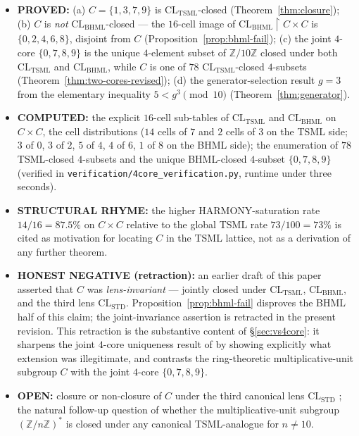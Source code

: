 \documentclass[11pt,reqno]{amsart}
\theoremstyle{plain}
\theoremstyle{definition}
\theoremstyle{remark}
\newcommand{\Z}{\mathbb{Z}}
\newcommand{\TSML}{\mathrm{TSML}}
\newcommand{\BHML}{\mathrm{BHML}}
\begin{document}
\begin{itemize}
\item \textbf{PROVED:} (a) $C = \{1, 3, 7, 9\}$ is $\mathrm{CL}_\TSML$-closed
(Theorem~\ref{thm:closure}); (b) $C$ is \emph{not}
$\mathrm{CL}_\BHML$-closed --- the $16$-cell image of
$\mathrm{CL}_\BHML \restriction C \times C$ is $\{0, 2, 4, 6, 8\}$,
disjoint from $C$ (Proposition~\ref{prop:bhml-fail}); (c) the joint
$4$-core $\{0, 7, 8, 9\}$ is the unique $4$-element subset of $\Z/10\Z$
closed under both $\mathrm{CL}_\TSML$ and $\mathrm{CL}_\BHML$, while
$C$ is one of $78$ $\mathrm{CL}_\TSML$-closed $4$-subsets
(Theorem~\ref{thm:two-cores-revised}); (d) the generator-selection
result $g = 3$ from the elementary inequality $5 < g^3 \pmod{10}$
(Theorem~\ref{thm:generator}).
\item \textbf{COMPUTED:} the explicit $16$-cell sub-tables of
$\mathrm{CL}_\TSML$ and $\mathrm{CL}_\BHML$ on $C \times C$, the cell
distributions ($14$ cells of $7$ and $2$ cells of $3$ on the TSML side;
$3$ of $0$, $3$ of $2$, $5$ of $4$, $4$ of $6$, $1$ of $8$ on the BHML
side); the enumeration of $78$ TSML-closed $4$-subsets and the unique
BHML-closed $4$-subset $\{0, 7, 8, 9\}$ (verified in
\texttt{verification/4core\_verification.py}, runtime under three
seconds).
\item \textbf{STRUCTURAL RHYME:} the higher HARMONY-saturation rate
$14/16 = 87.5\%$ on $C \times C$ relative to the global TSML rate
$73/100 = 73\%$ \cite[D10]{SandersForcing} is cited as motivation for
locating $C$ in the TSML lattice, not as a derivation of any further
theorem.
\item \textbf{HONEST NEGATIVE (retraction):} an earlier draft of this
paper asserted that $C$ was \emph{lens-invariant} --- jointly closed
under $\mathrm{CL}_\TSML$, $\mathrm{CL}_\BHML$, and the third lens
$\mathrm{CL}_\mathrm{STD}$.  Proposition~\ref{prop:bhml-fail}
disproves the BHML half of this claim; the joint-invariance assertion
is retracted in the present revision.  This retraction is the
substantive content of \S\ref{sec:vs4core}: it sharpens the joint
$4$-core uniqueness result of \cite{SandersGishFourCore} by showing
explicitly what extension was illegitimate, and contrasts the
ring-theoretic multiplicative-unit subgroup $C$ with the joint
$4$-core $\{0, 7, 8, 9\}$.
\item \textbf{OPEN:} closure or non-closure of $C$ under the third
canonical lens $\mathrm{CL}_\mathrm{STD}$ \cite{SandersGishThreeSubstrate};
the natural follow-up question of whether the multiplicative-unit
subgroup $(\Z/n\Z)^*$ is closed under any canonical TSML-analogue for
$n \neq 10$.
\end{itemize}
\end{document}

